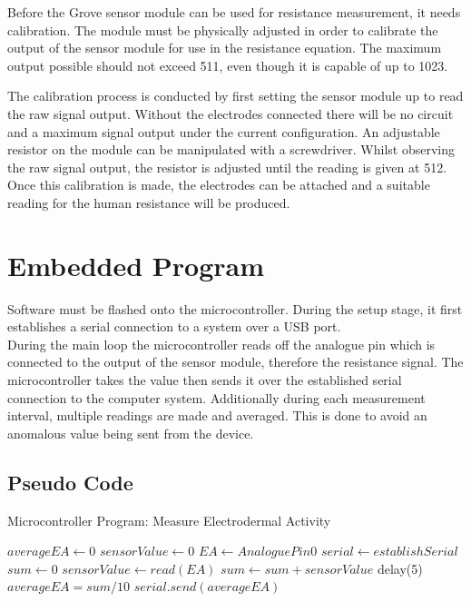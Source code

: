 \documentclass{report}
\begin{document}
Before the Grove sensor module can be used for resistance measurement, it needs calibration. The module must be physically adjusted in order to calibrate the 
output of the sensor module for use in the resistance equation. The maximum output possible should not exceed 511, even though it is capable of up to 1023.

The calibration process is conducted by first setting the sensor module up to read the raw signal output. Without the electrodes connected there will be no circuit
and a maximum signal output under the current configuration. An adjustable resistor on the module can be manipulated with a screwdriver. Whilst observing the
raw signal output, the resistor is adjusted until the reading is given at 512. Once this calibration is made, the electrodes can be attached and a suitable reading
for the human resistance will be produced.

\section{Embedded Program}

Software must be flashed onto the microcontroller. During the setup stage, it first establishes a serial connection to a system over a USB port.\\
During the main loop the microcontroller reads off the analogue pin which is connected to the output of the sensor module, therefore the resistance signal.
The microcontroller takes the value then sends it over the established serial connection to the computer system.
Additionally during each measurement interval, multiple readings are made and averaged. This is done to avoid an anomalous value being sent from the device.

\subsection{Pseudo Code}
\begin{algorithm}
\label{alg:mea}
\caption{Microcontroller Program: Measure Electrodermal Activity}
\begin{algorithmic}[1]
\State $averageEA \leftarrow 0$
\State $sensorValue \leftarrow 0$
\State $EA \leftarrow AnaloguePin0$
\vspace{0.3cm}
\State $serial \leftarrow establishSerial$
\EndFunction
\vspace{0.3cm}
\State $sum \leftarrow 0$
	\State $sensorValue \leftarrow read(EA)$
	\State $sum \leftarrow sum + sensorValue$
	\State delay(5)
\EndFor
\State $averageEA = sum / 10$
\State $serial.send(averageEA)$
\EndFunction
\State \Return
\end{algorithmic}
\end{algorithm}
\end{document}
